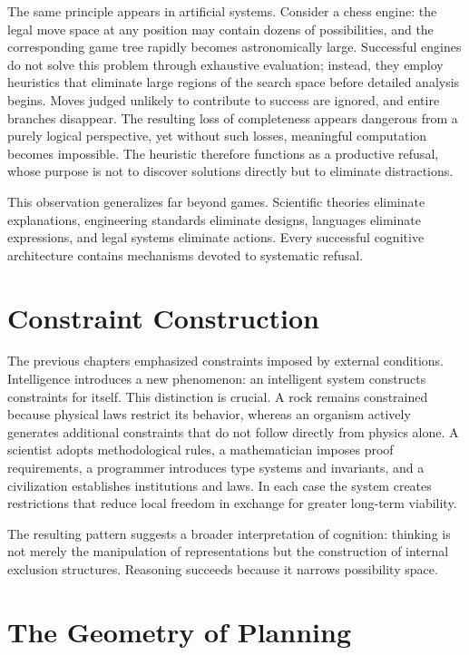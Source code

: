\documentclass[11pt,oneside]{book}
\theoremstyle{plain}
\theoremstyle{definition}
\theoremstyle{remark}
\begin{document}
The same principle appears in artificial systems. Consider a chess engine: the legal move space at any position may contain dozens of possibilities, and the corresponding game tree rapidly becomes astronomically large. Successful engines do not solve this problem through exhaustive evaluation; instead, they employ heuristics that eliminate large regions of the search space before detailed analysis begins. Moves judged unlikely to contribute to success are ignored, and entire branches disappear. The resulting loss of completeness appears dangerous from a purely logical perspective, yet without such losses, meaningful computation becomes impossible. The heuristic therefore functions as a productive refusal, whose purpose is not to discover solutions directly but to eliminate distractions.

This observation generalizes far beyond games. Scientific theories eliminate explanations, engineering standards eliminate designs, languages eliminate expressions, and legal systems eliminate actions. Every successful cognitive architecture contains mechanisms devoted to systematic refusal.

\section{Constraint Construction}

The previous chapters emphasized constraints imposed by external conditions. Intelligence introduces a new phenomenon: an intelligent system constructs constraints for itself. This distinction is crucial. A rock remains constrained because physical laws restrict its behavior, whereas an organism actively generates additional constraints that do not follow directly from physics alone. A scientist adopts methodological rules, a mathematician imposes proof requirements, a programmer introduces type systems and invariants, and a civilization establishes institutions and laws. In each case the system creates restrictions that reduce local freedom in exchange for greater long-term viability.

The resulting pattern suggests a broader interpretation of cognition: thinking is not merely the manipulation of representations but the construction of internal exclusion structures. Reasoning succeeds because it narrows possibility space.

\section{The Geometry of Planning}
\end{document}
